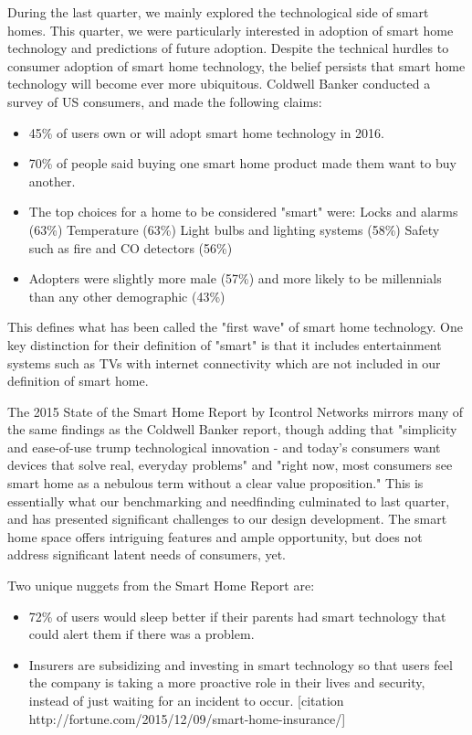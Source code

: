During the last quarter, we mainly explored the technological side of smart homes. This quarter, we were particularly interested in adoption of smart home technology and predictions of future adoption. Despite the technical hurdles to consumer adoption of smart home technology, the belief persists that smart home technology will become ever more ubiquitous. Coldwell Banker conducted a survey of US consumers, and made the following claims:
\begin{itemize}
\item 45\% of users own or will adopt smart home technology in 2016.
\item 70\% of people said buying one smart home product made them want to buy another.
\item The top choices for a home to be considered "smart" were:
    \subitem Locks and alarms (63\%)
    \subitem Temperature (63\%)
    \subitem Light bulbs and lighting systems (58\%)
    \subitem Safety such as fire and CO detectors (56\%)
\item Adopters were slightly more male (57\%) and more likely to be millennials than any other demographic (43\%)
\end{itemize}

\noindent
This defines what has been called the "first wave" of smart home technology. One key distinction for their definition of "smart" is that it includes entertainment systems such as TVs with internet connectivity which are not included in our definition of smart home.

The 2015 State of the Smart Home Report by Icontrol Networks mirrors many of the same findings as the Coldwell Banker report, though adding that "simplicity and ease-of-use trump technological innovation - and today's consumers want devices that solve real, everyday problems" and "right now, most consumers see smart home as a nebulous term without a clear value proposition." This is essentially what our benchmarking and needfinding culminated to last quarter, and has presented significant challenges to our design development. The smart home space offers intriguing features and ample opportunity, but does not address significant latent needs of consumers, yet.

\noindent
Two unique nuggets from the Smart Home Report are:
\begin{itemize}
    \item 72\% of users would sleep better if their parents had smart technology that could alert them if there was a problem.
    \item Insurers are subsidizing and investing in smart technology so that users feel the company is taking a more proactive role in their lives and security, instead of just waiting for an incident to occur. [citation http://fortune.com/2015/12/09/smart-home-insurance/]
\end{itemize}

